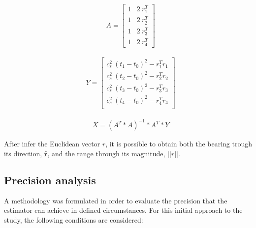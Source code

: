 \begin{eqnarray}
& A = 
\begin{bmatrix}
1 & 2\: r_1^{T}\\
1 & 2\: r_2^{T}\\
1 & 2\: r_3^{T}\\
1 & 2\: r_4^{T}
\end{bmatrix}
\label{eq:A}
\end{eqnarray}

\begin{eqnarray}
& Y = 
\begin{bmatrix}
c_s^{2}\: (t_1-t_0)^2 - r_1^{T} r_1\\
c_s^{2}\: (t_2-t_0)^2 - r_2^{T} r_2\\
c_s^{2}\: (t_3-t_0)^2 - r_3^{T} r_3\\
c_s^{2}\: (t_4-t_0)^2 - r_4^{T} r_4\\
\end{bmatrix}
\label{eq:Y}
\end{eqnarray}

\begin{eqnarray}
& X = (A^{T}*A)^{-1}*A^{T}*Y
\label{eq:least-square}
\end{eqnarray}

After infer the Euclidean vector $r$, it is possible to obtain both the bearing trough its direction, $\hat{\boldsymbol{r}}$, and the range through its magnitude, $||r||$.

\subsection{Precision analysis}  \label{subchap:precision-analy}

A methodology was formulated in order to evaluate the precision that the estimator can achieve in defined circumstances. For this initial approach to the study, the following conditions are considered: 

